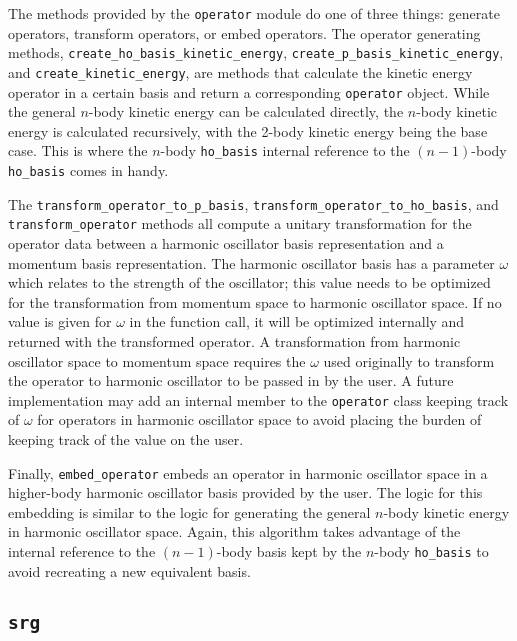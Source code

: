 The methods provided by the \texttt{operator} module do one of three things: generate operators, transform operators, or embed operators. The operator generating methods, \texttt{create\_ho\_basis\_kinetic\_energy}, \texttt{create\_p\_basis\_kinetic\_energy}, and \texttt{create\_kinetic\_energy}, are methods that calculate the kinetic energy operator in a certain basis and return a corresponding \texttt{operator} object. While the general $n$-body kinetic energy can be calculated directly, the $n$-body kinetic energy is calculated recursively, with the 2-body kinetic energy being the base case. This is where the $n$-body \texttt{ho\_basis} internal reference to the $(n-1)$-body \texttt{ho\_basis} comes in handy.

The \texttt{transform\_operator\_to\_p\_basis}, \texttt{transform\_operator\_to\_ho\_basis}, and \texttt{transform\_operator} methods all compute a unitary transformation for the operator data between a harmonic oscillator basis representation and a momentum basis representation. The harmonic oscillator basis has a parameter $\omega$ which relates to the strength of the oscillator; this value needs to be optimized for the transformation from momentum space to harmonic oscillator space. If no value is given for $\omega$ in the function call, it will be optimized internally and returned with the transformed operator. A transformation from harmonic oscillator space to momentum space requires the $\omega$ used originally to transform the operator to harmonic oscillator to be passed in by the user. A future implementation may add an internal member to the \texttt{operator} class keeping track of $\omega$ for operators in harmonic oscillator space to avoid placing the burden of keeping track of the value on the user.

Finally, \texttt{embed\_operator} embeds an operator in harmonic oscillator space in a higher-body harmonic oscillator basis provided by the user. The logic for this embedding is similar to the logic for generating the general $n$-body kinetic energy in harmonic oscillator space. Again, this algorithm takes advantage of the internal reference to the $(n-1)$-body basis kept by the $n$-body \texttt{ho\_basis} to avoid recreating a new equivalent basis.

\subsection{\texttt{srg}}

